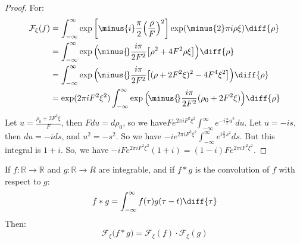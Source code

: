         \begin{proof}
        For:
        \begin{align}
            \mathcal{F}_{\xi}(f)
            &=\int_{-\infty}^{\infty}
                \exp\bigg[
                    \minus{i}\frac{\pi}{2}
                    \Big(\frac{\rho}{F}\Big)^2
                \bigg]
                \exp(\minus{2}\pi{i}\rho\xi)\diff{\rho}\\
            &=\int_{-\infty}^{\infty}
                \exp\Big(
                    {\!}\minus{\!}\frac{i\pi}{2F^{2}}
                    \big[
                        {\rho}^{2}+4F^{2}\rho\xi
                    \big]\Big)\diff{\rho}\\
            &=\int_{-\infty}^{\infty}
                \exp\Big(
                    {\!}\minus{\!}\frac{i\pi}{2F^{2}}
                    \big[
                        (\rho+2F^{2}\xi)^2-4F^{4}\xi^{2}
                    \big]
                \Big)\diff{\rho}\\
            &=\exp(2\pi{i}F^{2}\xi^{2})\int_{-\infty}^{\infty}
                \exp\Big(
                    {\!}\minus{\!}\frac{i\pi}{2F^2}
                    (\rho_0+2F^2\xi)
                \Big)\diff{\rho}
        \end{align}
        Let $u = \frac{\rho_0 + 2F^2 \xi}{F}$, then
        $Fdu = d\rho_0$, so we have$Fe^{2\pi i F^2 \xi^2} \int_{-\infty}^{\infty} e^{-i\frac{\pi}{2}u^2}du$.
        Let $u = -is$, then $du = -ids$, and $u^2 = -s^2$. So
        we have $-i e^{2\pi i F^2 \xi^2}\int_{-\infty}^{\infty} e^{i\frac{\pi}{2}s^2}ds$.
        But this integral is $1+i$. So, we have
        $-iFe^{2\pi iF^2\xi^2}(1+i)=(1-i)Fe^{2\pi iF^2 \xi^2}$.
        \end{proof}
        \begin{theorem}
            If $f:\mathbb{R}\rightarrow\mathbb{R}$ and
            $g:\mathbb{R}\rightarrow{R}$ are integrable,
            and if $f*g$ is the convolution of $f$ with
            respect to $g$:
            \begin{equation}
                f*g=\int_{-\infty}^{\infty}
                    f(\tau)g(\tau-t)\diff{\tau}
            \end{equation}
            Then:
            \begin{equation}
                \mathcal{F}_{\xi}\big(f*g\big)
                =\mathcal{F}_{\xi}(f)\cdot\mathcal{F}_{\xi}(g)
            \end{equation}
        \end{theorem}
